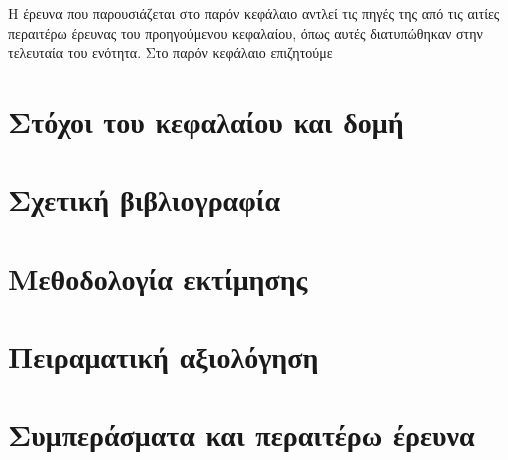 Η έρευνα που παρουσιάζεται στο παρόν κεφάλαιο αντλεί τις πηγές της από τις
αιτίες περαιτέρω έρευνας του προηγούμενου κεφαλαίου, όπως αυτές διατυπώθηκαν
στην τελευταία του ενότητα. Στο παρόν κεφάλαιο επιζητούμε

\section{Στόχοι του κεφαλαίου και δομή}
  \label{section:02_03_01}
  

\section{Σχετική βιβλιογραφία}
  \label{section:02_03_02}
  

\section{Μεθοδολογία εκτίμησης}
  \label{section:02_03_03}
  

\section{Πειραματική αξιολόγηση}
  \label{section:02_03_04}
  

\section{Συμπεράσματα και περαιτέρω έρευνα}
  \label{section:02_03_05}
  
